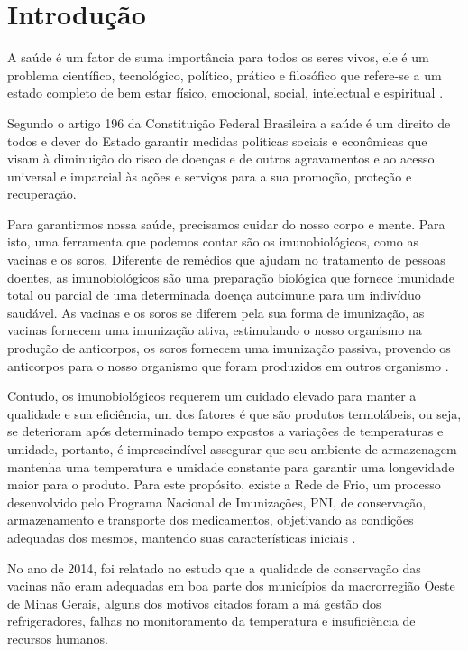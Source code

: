 \chapter[Introdução]{Introdução}
\label{cap:intro}
A saúde é um fator de suma importância para todos os seres vivos, ele é um problema científico, tecnológico, político, prático e filosófico que refere-se a um estado completo de bem estar físico, emocional, social, intelectual e espiritual \cite{almeida2011saude}. 

Segundo o artigo 196 \cite{de2013direito} da Constituição Federal Brasileira a saúde é um direito de todos e dever do Estado garantir medidas políticas sociais e econômicas que visam à diminuição do risco de doenças e de outros agravamentos e ao acesso universal e imparcial às ações e serviços para a sua promoção, proteção e recuperação.

Para garantirmos nossa saúde, precisamos cuidar do nosso corpo e mente. Para isto, uma ferramenta que podemos contar são os imunobiológicos, como as vacinas e os soros. Diferente de remédios que ajudam no tratamento de pessoas doentes, as imunobiológicos são uma preparação biológica que fornece imunidade total ou parcial de uma determinada doença autoimune para um indivíduo saudável. As vacinas e os soros se diferem pela sua forma de imunização, as vacinas fornecem uma imunização ativa, estimulando o nosso organismo na produção de anticorpos, os soros fornecem uma imunização passiva, provendo os anticorpos para o nosso organismo que foram produzidos  em outros organismo \cite{soma2018tratamento}.

Contudo, os imunobiológicos requerem um cuidado elevado para manter a qualidade e sua eficiência, um dos fatores é que são produtos termolábeis, ou seja, se deterioram após determinado tempo expostos a variações de temperaturas e umidade, portanto, é imprescindível assegurar que seu ambiente de armazenagem mantenha uma temperatura e umidade constante \cite{ministerio2001manual} para garantir uma longevidade maior para o produto. Para este propósito, existe a Rede de Frio, um processo desenvolvido pelo Programa Nacional de Imunizações, PNI, de conservação, armazenamento e transporte dos medicamentos, objetivando as condições adequadas dos mesmos, mantendo suas características iniciais \cite{ministerio2001manual}.

No ano de 2014, foi relatado no estudo \cite{oliveira2014avaliaccao} que a qualidade de conservação das vacinas não eram adequadas em boa parte dos municípios da macrorregião Oeste de Minas Gerais, alguns dos motivos citados foram a má gestão dos refrigeradores, falhas no monitoramento da temperatura e insuficiência de recursos humanos.

